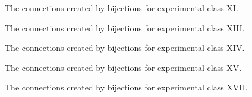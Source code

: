 \begin{figure}[ht!]
    \centering
    
    \caption{The connections created by bijections for experimental class XI.}
    \label{fig:expgrp_XI}
\end{figure}


\begin{comment}
\begin{figure}[ht!]
    \centering
    
    \caption{The connections created by bijections for experimental class XII.}
    \label{fig:expgrp_XII}
\end{figure}
\end{comment}


\begin{figure}[ht!]
    \centering
    
    \caption{The connections created by bijections for experimental class XIII.}
    \label{fig:expgrp_XIII}
\end{figure}


\begin{figure}[ht!]
    \centering
    
    \caption{The connections created by bijections for experimental class XIV.}
    \label{fig:expgrp_XIV}
\end{figure}


\begin{figure}[ht!]
    \centering
    
    \caption{The connections created by bijections for experimental class XV.}
    \label{fig:expgrp_XV}
\end{figure}


\begin{comment}
\begin{figure}[ht!]
    \centering
    
    \caption{The connections created by bijections for experimental class XVI.}
    \label{fig:expgrp_XVI}
\end{figure}
\end{comment}


\begin{figure}[ht!]
    \centering
    
    \caption{The connections created by bijections for experimental class XVII.}
    \label{fig:expgrp_XVII}
\end{figure}


